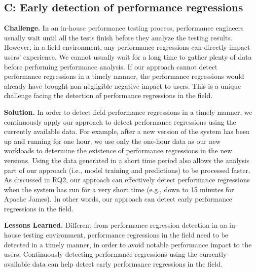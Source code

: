 \subsection*{C: Early detection of performance regressions}
\noindent\textbf{Challenge.}
In an in-house performance testing process, performance engineers usually wait until all the tests finish before they analyze the testing results.
However, in a field environment, any performance regressions can directly impact users' experience.
We cannot usually wait for a long time to gather plenty of data before performing performance analysis.
If our approach cannot detect performance regressions in a timely manner, the performance regressions would already have brought non-negligible negative impact to users.
This is a unique challenge facing the detection of performance regressions in the field.

\noindent\textbf{Solution.}
In order to detect field performance regressions in a timely manner, we continuously apply our approach to detect performance regressions using the currently available data.
For example, after a new version of the system has been up and running for one hour, we use only the one-hour data as our new workloads to determine the existence of performance regressions in the new versions.
Using the data generated in a short time period also allows the analysis part of our approach (i.e., model training and predictions) to be processed faster.
As discussed in RQ2, our approach can effectively detect performance regressions when the system has run for a very short time (e.g., down to 15 minutes for Apache James).
In other words, our approach can detect early performance regressions in the field.

\noindent\textbf{Lessons Learned.}
Different from performance regression detection in an in-house testing environment, performance regressions in the field need to be detected in a timely manner, in order to avoid notable performance impact to the users.
Continuously detecting performance regressions using the currently available data can help detect early performance regressions in the field.
